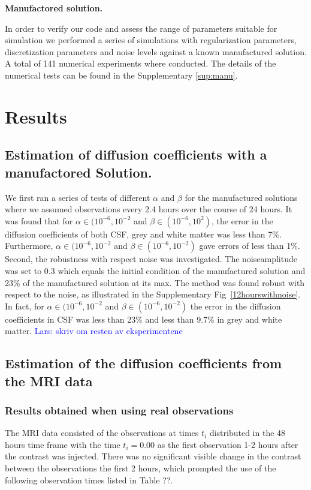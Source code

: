 \documentclass[12pt,a4paper]{article}
\newcommand{\kam}[1]{\textcolor{blue}{#1}}
\begin{document}
\textbf{Manufactored solution.}

In order to verify our code and assess the range of parameters suitable for simulation we performed a series of 
simulations with regularization parameters, discretization parameters and noise levels against a 
known manufactured solution. A total of 141 numerical experiments
where conducted. The details of the numerical tests can be found in the Supplementary \ref{sup:manu}. 

\textbf{}




\section{Results}

\subsection{Estimation of diffusion coefficients with a manufactored Solution.} 
We first ran a series of tests of different $\alpha$ and $\beta$ for the manufactured solutions where we assumed observations every 2.4 hours
over the course of 24 hours. It was found that for $\alpha \in (10^{-6}, 10^{-2}$ and $\beta\in(10^{-6}, 10^2)$, the error in 
the diffusion coefficients of both CSF, grey and white matter was less than 7\%. Furthermore,  
$\alpha \in (10^{-6}, 10^{-2}$ and $\beta\in(10^{-6}, 10^{-2})$ gave errors of less than 1\%. Second, the robustness with respect noise
was investigated. The noiseamplitude was set to 0.3 which equals the initial condition of the manufactured solution
and 23\% of the manufactured solution at its max. The method was found robust with respect to the noise, as illustrated in the Supplementary Fig~\ref{12hourswithnoise}.  In fact, for  $\alpha \in (10^{-6}, 10^{-2}$ and $\beta\in(10^{-6}, 10^{-2})$ the error in the diffusion coefficients in CSF was less than 23\% and less than 9.7\% in grey and white matter. \kam{Lars: skriv om resten av eksperimentene}   




\subsection{Estimation of the diffusion coefficients from the MRI data} 

\subsubsection{Results obtained when using real observations}
The MRI data consisted of the observations at times $t_i$ distributed in the 48 hours time frame with the time $t_i=0.00$ as the first observation 1-2 hours after the contrast was injected. There was no significant visible change in the contrast between the observations the first 2 hours, which prompted the use of the following observation times listed in Table ??.
\end{document}
